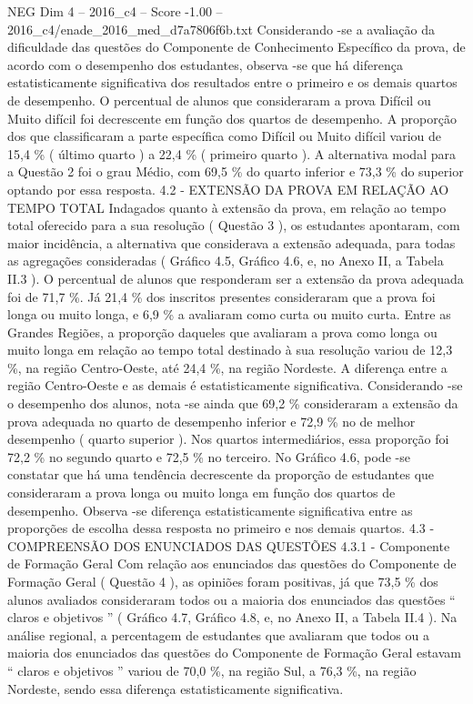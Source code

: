 \begin{textsample}{NEG Dim 4 – 2016\_c4 – Score -1.00 – 2016\_c4/enade\_2016\_med\_d7a7806f6b.txt}
Considerando -se a avaliação da dificuldade das questões do Componente de Conhecimento Específico da prova, de acordo com o desempenho dos estudantes, observa -se que há diferença estatisticamente significativa dos resultados entre o primeiro e os demais quartos de desempenho.
O percentual de alunos que consideraram a prova Difícil ou Muito difícil foi decrescente em função dos quartos de desempenho.
A proporção dos que classificaram a parte específica como Difícil ou Muito difícil variou de 15,4 \% ( último quarto ) a 22,4 \% ( primeiro quarto ).
A alternativa modal para a Questão 2 foi o grau Médio, com 69,5 \% do quarto inferior e 73,3 \% do superior optando por essa resposta. 4.2 - EXTENSÃO DA PROVA EM RELAÇÃO AO TEMPO TOTAL Indagados quanto à extensão da prova, em relação ao tempo total oferecido para a sua resolução ( Questão 3 ), os estudantes apontaram, com maior incidência, a alternativa que considerava a extensão adequada, para todas as agregações consideradas ( Gráfico 4.5, Gráfico 4.6, e, no Anexo II, a Tabela II.3 ).
O percentual de alunos que responderam ser a extensão da prova adequada foi de 71,7 \%.
Já 21,4 \% dos inscritos presentes consideraram que a prova foi longa ou muito longa, e 6,9 \% a avaliaram como curta ou muito curta.
Entre as Grandes Regiões, a proporção daqueles que avaliaram a prova como longa ou muito longa em relação ao tempo total destinado à sua resolução variou de 12,3 \%, na região Centro-Oeste, até 24,4 \%, na região Nordeste.
A diferença entre a região Centro-Oeste e as demais é estatisticamente significativa.
Considerando -se o desempenho dos alunos, nota -se ainda que 69,2 \% consideraram a extensão da prova adequada no quarto de desempenho inferior e 72,9 \% no de melhor desempenho ( quarto superior ).
Nos quartos intermediários, essa proporção foi 72,2 \% no segundo quarto e 72,5 \% no terceiro.
No Gráfico 4.6, pode -se constatar que há uma tendência decrescente da proporção de estudantes que consideraram a prova longa ou muito longa em função dos quartos de desempenho.
Observa -se diferença estatisticamente significativa entre as proporções de escolha dessa resposta no primeiro e nos demais quartos. 4.3 - COMPREENSÃO DOS ENUNCIADOS DAS QUESTÕES 4.3.1 - Componente de Formação Geral Com relação aos enunciados das questões do Componente de Formação Geral ( Questão 4 ), as opiniões foram positivas, já que 73,5 \% dos alunos avaliados consideraram todos ou a maioria dos enunciados das questões “ claros e objetivos ” ( Gráfico 4.7, Gráfico 4.8, e, no Anexo II, a Tabela II.4 ).
Na análise regional, a percentagem de estudantes que avaliaram que todos ou a maioria dos enunciados das questões do Componente de Formação Geral estavam “ claros e objetivos ” variou de 70,0 \%, na região Sul, a 76,3 \%, na região Nordeste, sendo essa diferença estatisticamente significativa.

\end{textsample}

